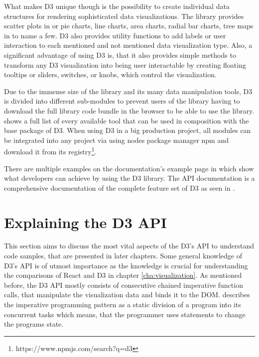 What makes D3 unique though is the possibility to create individual data structures for rendering sophisticated data visualizations. The library provides scatter plots in \cite[/d3-scale]{D3Github} or pie charts, line charts, area charts, radial bar charts, tree maps in \cite[/d3-shape]{D3Github} to name a few. D3 also provides utility functions to add labels or user interaction to each mentioned and not mentioned data visualization type. Also, a significant advantage of using D3 is, that it also provides simple methods to transform any D3 visualization into being user interactable by creating floating tooltips or sliders, switches, or knobs, which control the visualization.

Due to the immense size of the library and its many data manipulation tools, D3 is divided into different sub-modules to prevent users of the library having to download the full library code bundle in the browser to be able to use the library. \cite{D3Github} shows a full list of every available tool that can be used in composition with the base package of D3. When using D3 in a big production project, all modules can be integrated into any project via using nodes package manager npm and download it from its registry\footnote{https://www.npmjs.com/search?q=d3}.

\begin{emergency}{1em}
There are multiple examples on the documentation's example page in \cite{D3Examples} which show what developers can achieve by using the D3 library. The API documentation is a comprehensive documentation of the complete feature set of D3 as seen in \cite[\mbox{/d3/blob/master/API.md}]{D3Github}.
\end{emergency}


\section{Explaining the D3 API} 

This section aims to discuss the most vital aspects of the D3's API to understand code samples, that are presented in later chapters. Some general knowledge of D3's API is of utmost importance as the knowledge is crucial for understanding the comparisons of React and D3 in chapter \ref{cha:visualization}. As mentioned before, the D3 API mostly consists of consecutive chained imperative function calls, that manipulate the visualization data and binds it to the DOM. \cite[P.\ 625]{prgLngDesignImpl} describes the imperative programming pattern as a static division of a program into its concurrent tasks which means, that the programmer uses statements to change the programs state. 

